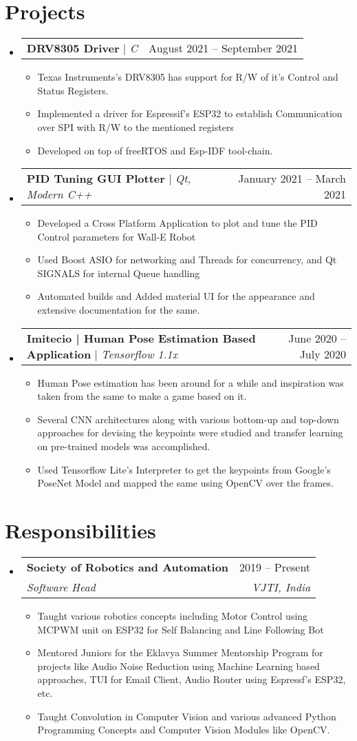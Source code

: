\documentclass[letterpaper,11pt]{article}
\makeatletter
\newcommand{\resumeItem}[1]{
  \item\small{
    {#1 \vspace{-2pt}}
  }
}
\newcommand{\resumeSubheading}[4]{
  \vspace{-2pt}\item
    \begin{tabular*}{0.97\textwidth}[t]{l@{\extracolsep{\fill}}r}
      \textbf{#1} & #2 \\
      \textit{\small#3} & \textit{\small #4} \\
    \end{tabular*}\vspace{-7pt}
}
\newcommand{\resumeProjectHeading}[2]{
    \item
    \begin{tabular*}{0.97\textwidth}{l@{\extracolsep{\fill}}r}
      \small#1 & #2 \\
    \end{tabular*}\vspace{-7pt}
}
\newcommand{\resumeSubHeadingListStart}{\begin{itemize}[leftmargin=0.15in, label={}]}
\newcommand{\resumeSubHeadingListEnd}{\end{itemize}}
\newcommand{\resumeItemListStart}{\begin{itemize}}
\newcommand{\resumeItemListEnd}{\end{itemize}\vspace{-5pt}}
\makeatother
\begin{document}
\section{Projects}
    \resumeSubHeadingListStart
        \resumeProjectHeading
            {\textbf{DRV8305 Driver} $|$ \emph{C}}{August 2021 -- September 2021}
            \resumeItemListStart
                \resumeItem{Texas Instruments's DRV8305 has support for R/W of it's Control and Status Registers.}
                \resumeItem{Implemented a driver for Espressif's ESP32 to establish Communication over SPI with R/W to the mentioned registers}
                \resumeItem{Developed on top of freeRTOS and Esp-IDF tool-chain.}
            \resumeItemListEnd
      \resumeProjectHeading
          {\textbf{PID Tuning GUI Plotter} $|$ \emph{Qt, Modern C++}}{January 2021 -- March 2021}
          \resumeItemListStart
                \resumeItem{Developed a Cross Platform Application to plot and tune the PID Control parameters for Wall-E Robot}
                \resumeItem{Used Boost ASIO for networking and Threads for concurrency, and Qt SIGNALS for internal Queue handling}
                \resumeItem{Automated builds and Added material UI for the appearance and extensive documentation for the same.}
          \resumeItemListEnd
      \resumeProjectHeading
          {\textbf{Imitecio | Human Pose Estimation Based Application} $|$ \emph{Tensorflow 1.1x}}{June 2020 -- July 2020}
          \resumeItemListStart
                \resumeItem{Human Pose estimation has been around for a while and inspiration was taken from the same to make a game based on it.}
                \resumeItem{Several CNN architectures along with various bottom-up and top-down approaches for devising the keypoints were studied and transfer learning on pre-trained models was accomplished.}
                \resumeItem{Used Tensorflow Lite's Interpreter to get the keypoints from Google's PoseNet Model and mapped the same using OpenCV over the frames.}
          \resumeItemListEnd
    
    \resumeSubHeadingListEnd
\section{Responsibilities}
    \resumeSubHeadingListStart
        \resumeSubheading
            {Society of Robotics and Automation}{2019 -- Present}
            {Software Head}{VJTI, India}
            \resumeItemListStart
            \resumeItem{Taught various robotics concepts including Motor Control using MCPWM unit on ESP32 for Self Balancing and Line Following Bot}
            \resumeItem{Mentored Juniors for the Eklavya Summer Mentorship Program for projects like Audio Noise Reduction using Machine Learning based approaches, TUI for Email Client, Audio Router using Espressf's ESP32, etc.}
            \resumeItem{Taught Convolution in Computer Vision and various advanced Python Programming Concepts and Computer Vision Modules like OpenCV.}
            \resumeItemListEnd
    \resumeSubHeadingListEnd
\end{document}
